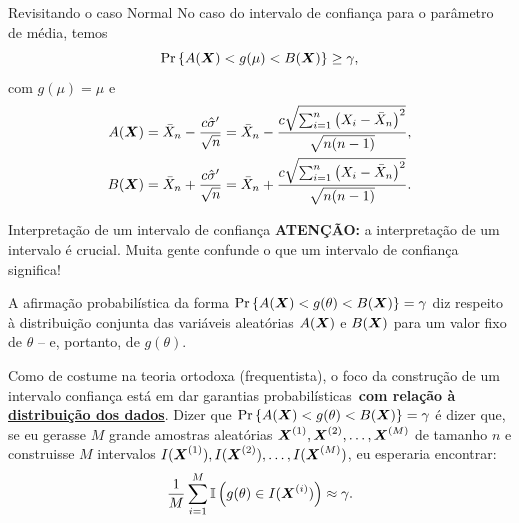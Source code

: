 \begin{frame}{Revisitando o caso Normal}
No caso do intervalo de confiança para o parâmetro de média, temos 
$$\operatorname{Pr}\left\{A(\boldsymbol{X}) < g(\mu) <  B(\boldsymbol{X})\right\} \geq \gamma,$$
com $g(\mu) = \mu$  e 
\begin{align*}
 A(\boldsymbol{X}) &= \bar{X}_n - \frac{c\hat{\sigma}^\prime}{\sqrt{n}} = \bar{X}_n - \frac{c\sqrt{\sum_{i=1}^n \left(X_i - \bar{X}_n\right)^2}}{\sqrt{n(n-1)}},\\
 B(\boldsymbol{X}) &= \bar{X}_n + \frac{c\hat{\sigma}^\prime}{\sqrt{n}} = \bar{X}_n + \frac{c\sqrt{\sum_{i=1}^n \left(X_i - \bar{X}_n\right)^2}}{\sqrt{n(n-1)}}.
\end{align*}
\end{frame}

\begin{frame}{Interpretação de um intervalo de confiança}
 \textbf{ATENÇÃO:} a interpretação de um intervalo é crucial.
 Muita gente confunde o que um intervalo de confiança significa!
 \begin{obs}
 \label{rmk:confidence_intervals_not_about_parameters}
  A afirmação probabilística da forma $\operatorname{Pr}\left\{A(\boldsymbol{X}) < g(\theta) <  B(\boldsymbol{X})\right\} = \gamma$ diz respeito à distribuição conjunta das variáveis aleatórias  $A(\boldsymbol{X})$ e $B(\boldsymbol{X})$ para um valor fixo de $\theta$ -- e, portanto, de $g(\theta)$.
 \end{obs}
 
 \begin{ideia}
 \label{idea:confidence_intervals_are_procedures} 
 Como de costume na teoria ortodoxa (frequentista), o foco da construção de um intervalo confiança está em dar garantias probabilísticas~\textbf{com relação à \underline{distribuição dos dados}}.
 Dizer que $\operatorname{Pr}\left\{A(\boldsymbol{X}) < g(\theta) <  B(\boldsymbol{X})\right\} = \gamma$ é dizer que, se eu gerasse $M$ grande amostras aleatórias $\boldsymbol{X}^{(1)}, \boldsymbol{X}^{(2)}, \ldots, \boldsymbol{X}^{(M)}$ de tamanho $n$ e construisse $M$ intervalos $I(\boldsymbol{X}^{(1)}), I(\boldsymbol{X}^{(2)}), \ldots, I(\boldsymbol{X}^{(M)})$, eu esperaria encontrar:
 \begin{equation*}
  \frac{1}{M}\sum_{i=1}^M \mathbb{I}\left(g(\theta) \in I(\boldsymbol{X}^{(i)}) \right) \approx \gamma.
 \end{equation*}
\end{ideia}
\end{frame}

